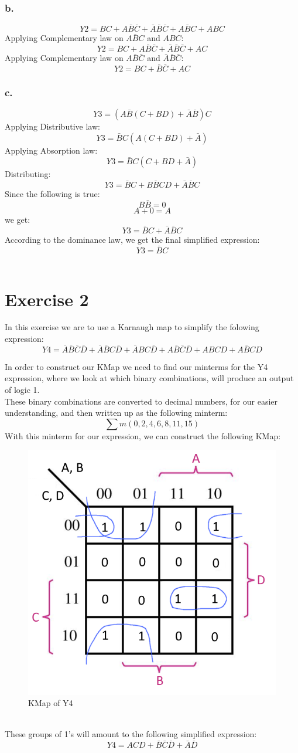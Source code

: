 \documentclass{article}
\begin{document}
\subsubsection*{b.} 
\[Y2 =  BC + A\bar{B}\bar{C} + \bar{A}\bar{B}\bar{C} + A\bar{B}C + ABC\]
Applying Complementary law on $A\bar{B}C$ and $ABC$: 
\[Y2 = BC + A\bar{B}\bar{C} + \bar{A}\bar{B}\bar{C} + AC\]
Applying Complementary law on $A\bar{B}\bar{C}$ and $\bar{A}\bar{B}\bar{C}$:
\[Y2 = BC + \bar{B}\bar{C} + AC\]


\subsubsection*{c.} 
\[Y3 =  (A\bar{B}(C+BD) + \bar{A}\bar{B})C \]
Applying Distributive law: 
\[Y3 = \bar{B}C(A(C+BD)+\bar{A})\]
Applying Absorption law: 
\[Y3 = \bar{B}C(C+BD+\bar{A})\]
Distributing: 
\[Y3 = \bar{B}C + B\bar{B}CD + \bar{A}\bar{B}C\]
Since the following is true: \\
\[B\bar{B} = 0\]
\[A + 0 = A\]
we get: 
\[Y3 = \bar{B}C + \bar{A}\bar{B}C\]
According to the dominance law, we get the final simplified expression: 
\[Y3 = \bar{B}C\]\\[0.5cm]

 \addtocounter{section}{1}
\section*{Exercise 2}
In this exercise we are to use a Karnaugh map to simplify the folowing expression:
\[Y4 = \bar{A}\bar{B}\bar{C}\bar{D} + \bar{A}\bar{B}C\bar{D} + \bar{A}BC\bar{D} + A\bar{B}\bar{C}\bar{D} + ABCD + A\bar{B}CD\]

\noindent In order to construct our KMap we need to find our minterms for the Y4 expression, where we look at which binary 
combinations, will produce an output of logic 1. \\
These binary combinations are converted to decimal numbers, for our easier understanding, and then written up as 
the following minterm:
\[\sum m (0, 2, 4, 6, 8, 11, 15)\]
With this minterm for our expression, we can construct the following KMap:
\begin{figure}[h]
  \centering
  \caption{KMap of Y4}\label{fig:Y4}\hypertarget{Y4}{\space}
  \includegraphics[width=0.4\linewidth, keepaspectratio=true]{Y4KMAP}
\end{figure}\\
\noindent These groups of 1's will amount to the following simplified expression:
\[Y4 = ACD + \bar{B}\bar{C}\bar{D} + \bar{A}\bar{D}\]
\end{document}
